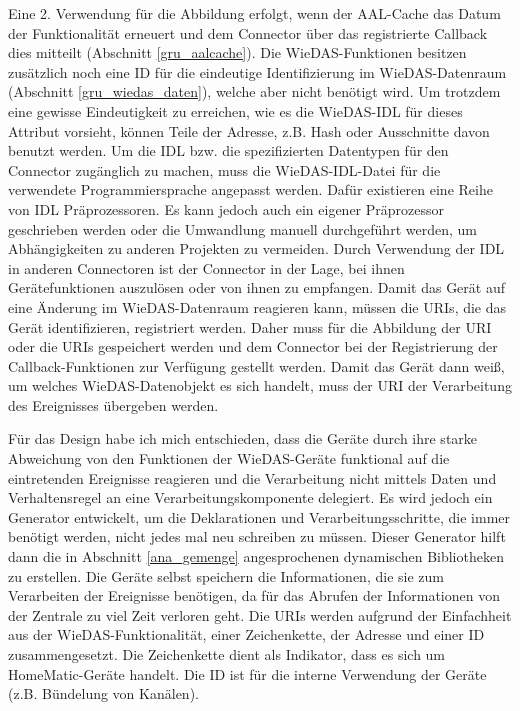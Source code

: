 Eine 2. Verwendung für die Abbildung erfolgt, wenn der AAL-Cache das Datum der Funktionalität
erneuert und dem Connector über das registrierte Callback dies mitteilt (Abschnitt \ref{gru_aalcache}).
Die WieDAS-Funktionen besitzen zusätzlich noch eine ID für die eindeutige Identifizierung
im WieDAS-Datenraum (Abschnitt \ref{gru_wiedas_daten}), welche aber nicht benötigt wird.
Um trotzdem eine gewisse Eindeutigkeit zu erreichen, wie es die WieDAS-IDL
für dieses Attribut vorsieht, können Teile der Adresse, z.B. Hash oder
Ausschnitte davon benutzt werden.
Um die IDL bzw. die spezifizierten Datentypen für den Connector zugänglich zu machen, muss die
WieDAS-IDL-Datei für die verwendete Programmiersprache angepasst werden.
Dafür existieren eine Reihe von IDL Präprozessoren.
Es kann jedoch auch ein eigener Präprozessor geschrieben werden oder die Umwandlung manuell
durchgeführt werden, um Abhängigkeiten zu anderen Projekten zu vermeiden.
Durch Verwendung der IDL in anderen Connectoren ist der Connector in der Lage, bei ihnen
Gerätefunktionen auszulösen oder von ihnen zu empfangen.
Damit das Gerät auf eine Änderung im WieDAS-Datenraum reagieren kann, müssen die URIs,
die das Gerät identifizieren, registriert werden.
Daher muss für die Abbildung der URI oder die URIs gespeichert werden und dem Connector
bei der Registrierung der Callback-Funktionen zur Verfügung gestellt werden.
Damit das Gerät dann weiß, um welches WieDAS-Datenobjekt es sich handelt, muss der URI
der Verarbeitung des Ereignisses übergeben werden.

Für das Design habe ich mich entschieden, dass die Geräte durch ihre starke Abweichung von den
Funktionen der WieDAS-Geräte funktional auf die eintretenden Ereignisse reagieren und die
Verarbeitung nicht mittels Daten und Verhaltensregel an eine Verarbeitungskomponente delegiert.
Es wird jedoch ein Generator entwickelt, um die Deklarationen und Verarbeitungsschritte, die immer
benötigt werden, nicht jedes mal neu schreiben zu müssen.
Dieser Generator hilft dann die in Abschnitt \ref{ana_gemenge} angesprochenen dynamischen
Bibliotheken zu erstellen.
Die Geräte selbst speichern die Informationen, die sie zum Verarbeiten der Ereignisse
benötigen, da für das Abrufen der Informationen von der Zentrale zu viel Zeit verloren geht.
Die URIs werden aufgrund der Einfachheit aus der WieDAS-Funktionalität, einer Zeichenkette,
der Adresse und einer ID zusammengesetzt.
Die Zeichenkette dient als Indikator, dass es sich um HomeMatic-Geräte handelt.
Die ID ist für die interne Verwendung der Geräte (z.B. Bündelung von Kanälen).

